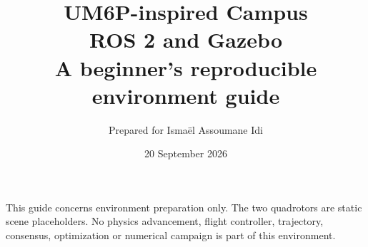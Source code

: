\documentclass[11pt,a4paper]{article}
\title{\textcolor{campusred}{UM6P-inspired Campus}\\ROS 2 and Gazebo\\\large A beginner's reproducible environment guide}
\author{Prepared for Isma\"el Assoumane Idi}
\date{20 September 2026}
\begin{document}
\maketitle
\noindent This guide concerns environment preparation only. The two quadrotors are static scene placeholders. No physics advancement, flight controller, trajectory, consensus, optimization or numerical campaign is part of this environment.
\setcounter{tocdepth}{1}
{\small\setlength{\parskip}{0pt}\tableofcontents}
\clearpage

\clearpage
\appendix

\end{document}
